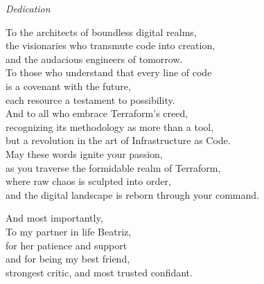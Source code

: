 \cleardoublepage  %
\thispagestyle{empty}  %

\begin{center}
{\Large\textit{Dedication}}\\[3cm]

\begin{em}
To the architects of boundless digital realms,\\
the visionaries who transmute code into creation,\\
and the audacious engineers of tomorrow.\\[2em]

To those who understand that every line of code\\
is a covenant with the future,\\
each resource a testament to possibility.\\[2em]

And to all who embrace Terraform's creed,\\
recognizing its methodology as more than a tool,\\
but a revolution in the art of Infrastructure as Code.\\[2em]

May these words ignite your passion,\\
as you traverse the formidable realm of Terraform,\\
where raw chaos is sculpted into order,\\
and the digital landscape is reborn through your command.\\[3em]

    \vspace{1cm}

{\small
And most importantly,\\
To my partner in life Beatriz,\\
for her patience and support\\
and for being my best friend,\\
strongest critic, and most trusted confidant.}
\end{em}
\end{center}

\clearpage